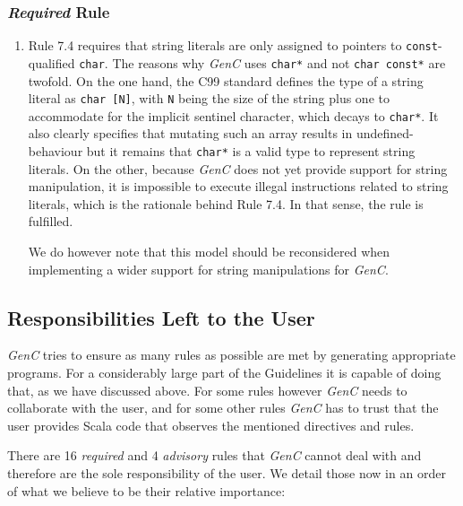 \documentclass[a4paper,twoside]{article}
\newcommand{\InlineC}[1]{\lstinline[language=C99]|#1|}
\newcommand{\GenC}{\emph{GenC}\xspace}
\begin{document}
\subsubsection*{\emph{Required} Rule}

\begin{enumerate}

\item Rule 7.4 requires that string literals are only assigned to pointers to
\InlineC{const}-qualified \InlineC{char}. The reasons why \GenC uses
\InlineC{char*} and not \InlineC{char const*} are twofold. On the one hand, the
C99 standard defines the type of a string literal as \InlineC{char [N]}, with
\InlineC{N} being the size of the string plus one to accommodate for the
implicit sentinel character, which decays to \InlineC{char*}. It also
clearly specifies that mutating such an array results in undefined-behaviour but
it remains that \InlineC{char*} is a valid type to represent string literals. On
the other, because \GenC does not yet provide support for string manipulation,
it is impossible to execute illegal instructions related to string literals,
which is the rationale behind Rule 7.4. In that sense, the rule is fulfilled.

We do however note that this model should be reconsidered when implementing
a wider support for string manipulations for \GenC.

\end{enumerate}


\subsection{Responsibilities Left to the User}
\label{user_responsibility}

\GenC tries to ensure as many rules as possible are met by generating
appropriate programs. For a considerably large part of the Guidelines it is
capable of doing that, as we have discussed above. For some rules however \GenC
needs to collaborate with the user, and for some other rules \GenC has to trust
that the user provides Scala code that observes the mentioned directives and
rules.

There are 16 \emph{required} and 4 \emph{advisory} rules that \GenC cannot deal
with and therefore are the sole responsibility of the user. We detail those now
in an order of what we believe to be their relative importance:
\end{document}
